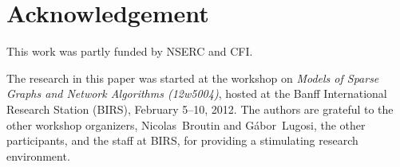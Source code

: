 \documentclass{patmorin}
\begin{document}
\section*{Acknowledgement}

This work was partly funded by NSERC and CFI.

The research in this paper was started at the workshop on \emph{Models
of Sparse Graphs and Network Algorithms (12w5004)}, hosted at the Banff
International Research Station (BIRS), February 5--10, 2012.  The authors
are grateful to the other workshop organizers, Nicolas~Broutin and
G\'abor~Lugosi, the other participants, and the staff at BIRS, for
providing a stimulating research environment.



\end{document}
